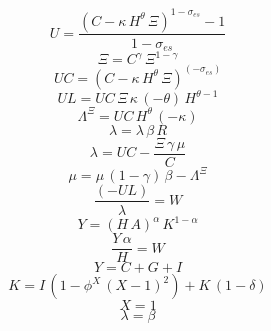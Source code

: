 \begin{dmath}
{U}=\frac{\left({C}-{{\kappa}}\, {H}^{{{\theta}}}\, {{\Xi}}\right)^{1-{{\sigma_{es}}}}-1}{1-{{\sigma_{es}}}}
\end{dmath}
\begin{dmath}
{{\Xi}}={C}^{{{\gamma}}}\, {{\Xi}}^{1-{{\gamma}}}
\end{dmath}
\begin{dmath}
{UC}=\left({C}-{{\kappa}}\, {H}^{{{\theta}}}\, {{\Xi}}\right)^{\left(-{{\sigma_{es}}}\right)}
\end{dmath}
\begin{dmath}
{UL}={UC}\, {{\Xi}}\, {{\kappa}}\, \left(-{{\theta}}\right)\, {H}^{{{\theta}}-1}
\end{dmath}
\begin{dmath}
{{\Lambda^{\Xi}}}={UC}\, {H}^{{{\theta}}}\, \left(-{{\kappa}}\right)
\end{dmath}
\begin{dmath}
{{\lambda}}={{\lambda}}\, {{\beta}}\, {R}
\end{dmath}
\begin{dmath}
{{\lambda}}={UC}-\frac{{{\Xi}}\, {{\gamma}}\, {{\mu}}}{{C}}
\end{dmath}
\begin{dmath}
{{\mu}}={{\mu}}\, \left(1-{{\gamma}}\right)\, {{\beta}}-{{\Lambda^{\Xi}}}
\end{dmath}
\begin{dmath}
\frac{\left(-{UL}\right)}{{{\lambda}}}={W}
\end{dmath}
\begin{dmath}
{Y}=\left({H}\, {A}\right)^{{{\alpha}}}\, {K}^{1-{{\alpha}}}
\end{dmath}
\begin{dmath}
\frac{{Y}\, {{\alpha}}}{{H}}={W}
\end{dmath}
\begin{dmath}
{Y}={C}+{G}+{I}
\end{dmath}
\begin{dmath}
{K}={I}\, \left(1-{{\phi^X}}\, \left({X}-1\right)^{2}\right)+{K}\, \left(1-{{\delta}}\right)
\end{dmath}
\begin{dmath}
{X}=1
\end{dmath}
\begin{dmath}
{\lambda}={{\beta}}
\end{dmath}
